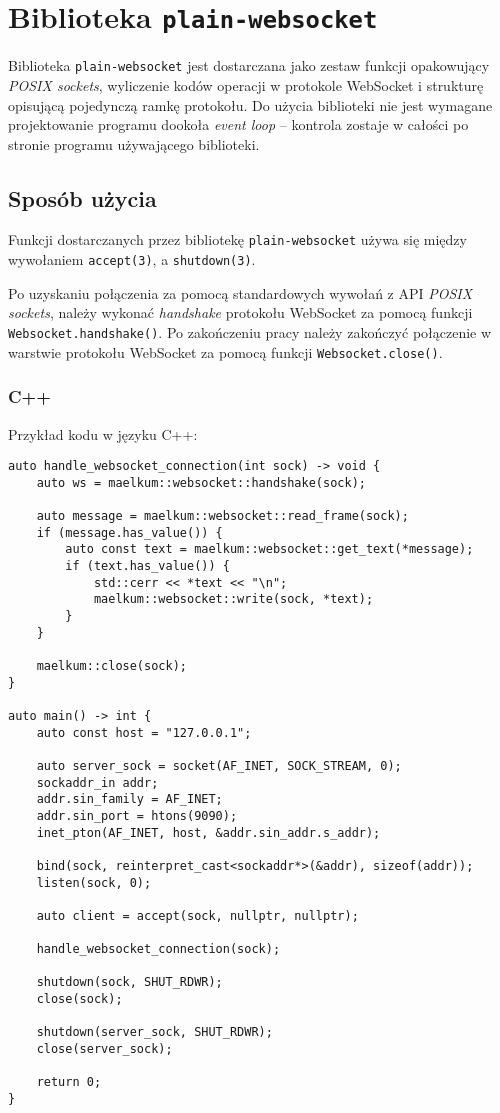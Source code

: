 \chapter{Biblioteka \texttt{plain-websocket}}
\label{plain_websocket_library}

Biblioteka \texttt{plain-websocket} jest dostarczana jako zestaw funkcji
opakowujący \emph{POSIX sockets}, wyliczenie kodów operacji w protokole
WebSocket i strukturę opisującą pojedynczą ramkę protokołu. Do użycia biblioteki
nie jest wymagane projektowanie programu dookoła \emph{event loop} -- kontrola
zostaje w całości po stronie programu używającego biblioteki.

\section{Sposób użycia}

Funkcji dostarczanych przez bibliotekę \texttt{plain-websocket} używa się między
wywołaniem \texttt{accept(3)}, a \texttt{shutdown(3)}.

Po uzyskaniu połączenia za pomocą standardowych wywołań z API \emph{POSIX
sockets}, należy wykonać \emph{handshake} protokołu WebSocket za pomocą funkcji
\texttt{Websocket.handshake()}. Po zakończeniu pracy należy zakończyć połączenie
w warstwie protokołu WebSocket za pomocą funkcji \texttt{Websocket.close()}.

\subsection{C++}

Przykład kodu w języku C++:
\begin{small}
\begin{lstlisting}
auto handle_websocket_connection(int sock) -> void {
    auto ws = maelkum::websocket::handshake(sock);

    auto message = maelkum::websocket::read_frame(sock);
    if (message.has_value()) {
        auto const text = maelkum::websocket::get_text(*message);
        if (text.has_value()) {
            std::cerr << *text << "\n";
            maelkum::websocket::write(sock, *text);
        }
    }

    maelkum::close(sock);
}

auto main() -> int {
    auto const host = "127.0.0.1";

    auto server_sock = socket(AF_INET, SOCK_STREAM, 0);
    sockaddr_in addr;
    addr.sin_family = AF_INET;
    addr.sin_port = htons(9090);
    inet_pton(AF_INET, host, &addr.sin_addr.s_addr);

    bind(sock, reinterpret_cast<sockaddr*>(&addr), sizeof(addr));
    listen(sock, 0);

    auto client = accept(sock, nullptr, nullptr);

    handle_websocket_connection(sock);

    shutdown(sock, SHUT_RDWR);
    close(sock);

    shutdown(server_sock, SHUT_RDWR);
    close(server_sock);

    return 0;
}
\end{lstlisting}
\end{small}

